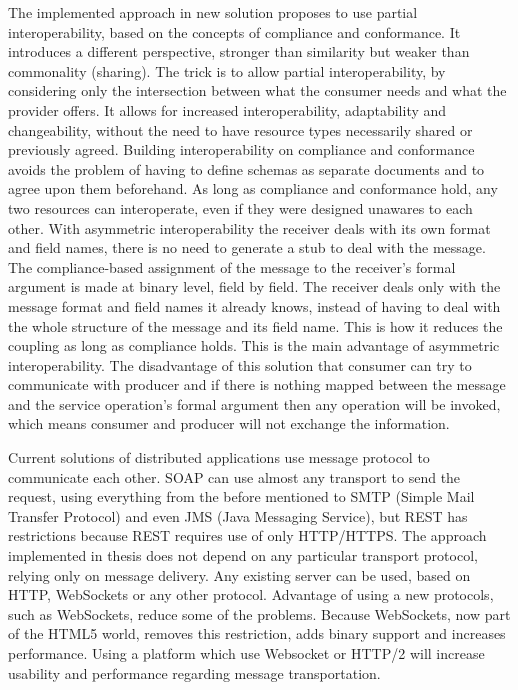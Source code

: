 \documentclass[runningheads,a4paper]{llncs}
\begin{document}
The implemented approach in new solution proposes to use partial interoperability, based on the concepts of compliance and conformance. It introduces a different perspective, stronger than similarity but weaker than commonality (sharing). The trick is to allow partial interoperability, by considering only the intersection between what the consumer needs and what the provider offers. It allows for increased interoperability, adaptability and changeability, without the need to have resource types necessarily shared or previously agreed. Building interoperability on compliance and conformance avoids the problem of having to define schemas as separate documents and to agree upon them beforehand. As long as compliance and conformance hold, any two resources can interoperate, even if they were designed unawares to each other. With asymmetric interoperability the receiver deals with its own format and field names, there is no need to generate a stub to deal with the message. The compliance-based assignment of the message to the receiver’s formal argument is made at binary level, field by field. The receiver deals only with the message format and field names it already knows, instead of having to deal with the whole structure of the message and its field name. This is how it reduces the coupling as long as compliance holds. This is the main advantage of asymmetric interoperability. The disadvantage of this solution that consumer can try to communicate with producer and if there is nothing mapped between the message and the service operation’s formal argument then any operation will be invoked, which means consumer and producer will not exchange the information.

Current solutions of distributed applications use message protocol to communicate each other. SOAP can use almost any transport to send the request, using everything from the before mentioned to SMTP (Simple Mail Transfer Protocol) and even JMS (Java Messaging Service), but REST has restrictions because REST requires use of only HTTP/HTTPS. The approach implemented in thesis does not depend on any particular transport protocol, relying only on message delivery. Any existing server can be used, based on HTTP, WebSockets or any other protocol. Advantage of using a new protocols, such as WebSockets, reduce some of the problems. Because WebSockets, now part of the HTML5 world, removes this restriction, adds binary support and increases performance. Using a platform which use Websocket or HTTP/2 will increase usability and performance regarding message transportation.
\end{document}
